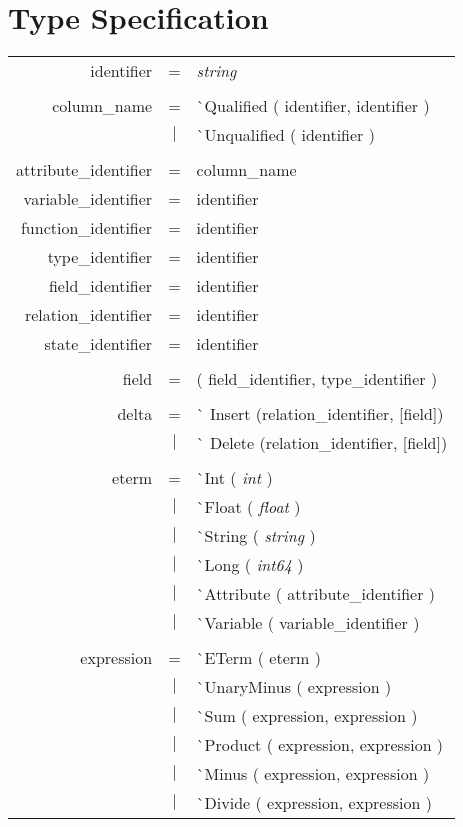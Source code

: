 \documentclass{article}
\begin{document}
\section{Type Specification}
\begin{tabular}[ht] {rcl}
identifier & = & \emph{string}\\
\\
column\_name &=& \`{}Qualified ( identifier, identifier )\\
&$\lvert$ & \`{}Unqualified ( identifier ) \\
\\
attribute\_identifier &=& column\_name\\
variable\_identifier &=& identifier\\
function\_identifier &=& identifier\\
type\_identifier &=& identifier\\
field\_identifier &=& identifier\\
relation\_identifier &=& identifier\\
state\_identifier &=& identifier\\
\\
field &=& ( field\_identifier, type\_identifier ) \\
\\
delta &=& \`{} Insert (relation\_identifier, [field]) \\
& $\lvert$ &  \`{} Delete (relation\_identifier, [field]) \\
\\
eterm &=& \`{}Int ( \emph{int} )\\
&$\lvert$ & \`{}Float ( \emph{float} )\\
&$\lvert$ & \`{}String ( \emph{string} )\\
&$\lvert$ & \`{}Long ( \emph{int64} )\\
&$\lvert$ & \`{}Attribute ( attribute\_identifier )\\
&$\lvert$ & \`{}Variable ( variable\_identifier )\\
\\
expression & =& \`{}ETerm ( eterm )\\
&$\lvert$ & \`{}UnaryMinus ( expression )\\
&$\lvert$ & \`{}Sum ( expression, expression )\\
&$\lvert$ & \`{}Product ( expression, expression )\\
&$\lvert$ & \`{}Minus ( expression, expression )\\
&$\lvert$ & \`{}Divide ( expression, expression ) \\

\end{tabular}
\end{document}

